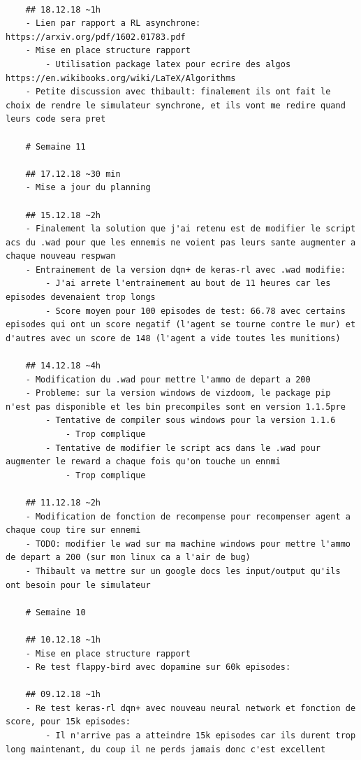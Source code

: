 \documentclass[a4paper,10pt,openany,oneside]{report}
\begin{document}
\begin{lstlisting}
	
	## 18.12.18 ~1h
	- Lien par rapport a RL asynchrone: https://arxiv.org/pdf/1602.01783.pdf
	- Mise en place structure rapport
		- Utilisation package latex pour ecrire des algos https://en.wikibooks.org/wiki/LaTeX/Algorithms
	- Petite discussion avec thibault: finalement ils ont fait le choix de rendre le simulateur synchrone, et ils vont me redire quand leurs code sera pret
	
	# Semaine 11
	
	## 17.12.18 ~30 min
	- Mise a jour du planning
	
	## 15.12.18 ~2h
	- Finalement la solution que j'ai retenu est de modifier le script acs du .wad pour que les ennemis ne voient pas leurs sante augmenter a chaque nouveau respwan
	- Entrainement de la version dqn+ de keras-rl avec .wad modifie:
		- J'ai arrete l'entrainement au bout de 11 heures car les episodes devenaient trop longs
		- Score moyen pour 100 episodes de test: 66.78 avec certains episodes qui ont un score negatif (l'agent se tourne contre le mur) et d'autres avec un score de 148 (l'agent a vide toutes les munitions)
	
	## 14.12.18 ~4h
	- Modification du .wad pour mettre l'ammo de depart a 200
	- Probleme: sur la version windows de vizdoom, le package pip n'est pas disponible et les bin precompiles sont en version 1.1.5pre
		- Tentative de compiler sous windows pour la version 1.1.6
			- Trop complique
		- Tentative de modifier le script acs dans le .wad pour augmenter le reward a chaque fois qu'on touche un ennmi
			- Trop complique
	
	## 11.12.18 ~2h
	- Modification de fonction de recompense pour recompenser agent a chaque coup tire sur ennemi
	- TODO: modifier le wad sur ma machine windows pour mettre l'ammo de depart a 200 (sur mon linux ca a l'air de bug)
	- Thibault va mettre sur un google docs les input/output qu'ils ont besoin pour le simulateur
	
	# Semaine 10
	
	## 10.12.18 ~1h
	- Mise en place structure rapport
	- Re test flappy-bird avec dopamine sur 60k episodes:
	
	## 09.12.18 ~1h
	- Re test keras-rl dqn+ avec nouveau neural network et fonction de score, pour 15k episodes:
		- Il n'arrive pas a atteindre 15k episodes car ils durent trop long maintenant, du coup il ne perds jamais donc c'est excellent
	

\end{lstlisting}
\end{document}
